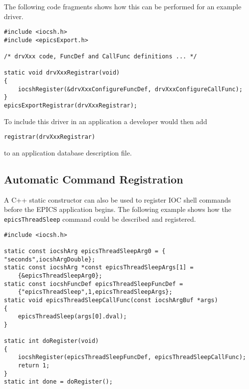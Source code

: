The following code fragments shows how this can be performed for an example driver.

\begin{verbatim}
#include <iocsh.h>
#include <epicsExport.h>

/* drvXxx code, FuncDef and CallFunc definitions ... */

static void drvXxxRegistrar(void)
{
    iocshRegister(&drvXxxConfigureFuncDef, drvXxxConfigureCallFunc);
}
epicsExportRegistrar(drvXxxRegistrar);
\end{verbatim}

To include this driver in an application a developer would then add

\begin{verbatim}
registrar(drvXxxRegistrar)
\end{verbatim}

to an application database description file.

\subsection{Automatic Command Registration}

A C++ static constructor can also be used to register IOC shell commands before the EPICS application begins. The 
following example shows how the \verb|epicsThreadSleep| command could be described and registered.

\begin{verbatim}
#include <iocsh.h>

static const iocshArg epicsThreadSleepArg0 = { "seconds",iocshArgDouble};
static const iocshArg *const epicsThreadSleepArgs[1] =
    {&epicsThreadSleepArg0};
static const iocshFuncDef epicsThreadSleepFuncDef =
    {"epicsThreadSleep",1,epicsThreadSleepArgs};
static void epicsThreadSleepCallFunc(const iocshArgBuf *args)
{
    epicsThreadSleep(args[0].dval);
}

static int doRegister(void)
{
    iocshRegister(epicsThreadSleepFuncDef, epicsThreadSleepCallFunc);
    return 1;
}
static int done = doRegister();
\end{verbatim}

